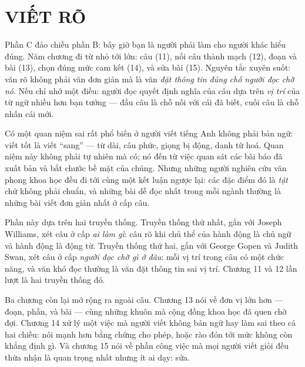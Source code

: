 \documentclass[../english.tex]{subfiles}
\begin{document}
\part{VIẾT RÕ}
\begin{tomtat}
Phần C đảo chiều phần B: bây giờ bạn là người phải làm cho người khác hiểu đúng. Năm chương đi từ nhỏ tới lớn: câu (11), nối câu thành mạch (12), đoạn và bài (13), chọn đúng mức cam kết (14), và sửa bài (15). Nguyên tắc xuyên suốt: văn rõ không phải văn đơn giản mà là văn \emph{đặt thông tin đúng chỗ người đọc chờ nó}. Nếu chỉ nhớ một điều: người đọc quyết định nghĩa của câu dựa trên \emph{vị trí} của từ ngữ nhiều hơn bạn tưởng --- đầu câu là chỗ nối với cái đã biết, cuối câu là chỗ nhấn cái mới.
\end{tomtat}

Có một quan niệm sai rất phổ biến ở người viết tiếng Anh không phải bản ngữ: viết tốt là viết ``sang'' --- từ dài, câu phức, giọng bị động, danh từ hoá. Quan niệm này không phải tự nhiên mà có; nó đến từ việc quan sát các bài báo đã xuất bản và bắt chước bề mặt của chúng. Nhưng những người nghiên cứu văn phong khoa học đều đi tới cùng một kết luận ngược lại: các đặc điểm đó là \emph{tật} chứ không phải chuẩn, và những bài dễ đọc nhất trong mỗi ngành thường là những bài viết đơn giản nhất ở cấp câu.

Phần này dựa trên hai truyền thống. Truyền thống thứ nhất, gắn với Joseph Williams, xét câu ở cấp \emph{ai làm gì}: câu rõ khi chủ thể của hành động là chủ ngữ và hành động là động từ. Truyền thống thứ hai, gắn với George Gopen và Judith Swan, xét câu ở cấp \emph{người đọc chờ gì ở đâu}: mỗi vị trí trong câu có một chức năng, và văn khó đọc thường là văn đặt thông tin sai vị trí. Chương 11 và 12 lần lượt là hai truyền thống đó.

Ba chương còn lại mở rộng ra ngoài câu. Chương 13 nói về đơn vị lớn hơn --- đoạn, phần, và bài --- cùng những khuôn mà cộng đồng khoa học đã quen chờ đợi. Chương 14 xử lý một việc mà người viết không bản ngữ hay làm sai theo cả hai chiều: nói mạnh hơn bằng chứng cho phép, hoặc rào đón tới mức không còn khẳng định gì. Và chương 15 nói về phần công việc mà mọi người viết giỏi đều thừa nhận là quan trọng nhất nhưng ít ai dạy: sửa.






\ifSubfilesClassLoaded{\printbibliography[title={Nguồn}]}{}
\end{document}
